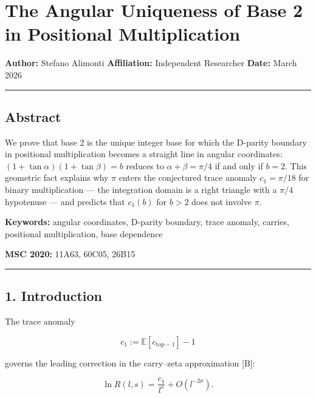 \documentclass[
  11pt,
]{article}
\author{Stefano Alimonti --- stefalimonti@gmail.com}
\date{March 2026}
\begin{document}
{
\hypersetup{linkcolor=black}
\setcounter{tocdepth}{2}
\tableofcontents
}
\section{The Angular Uniqueness of Base 2 in Positional
Multiplication}\label{the-angular-uniqueness-of-base-2-in-positional-multiplication}

\textbf{Author:} Stefano Alimonti \textbf{Affiliation:} Independent Researcher
\textbf{Date:} March 2026

\begin{center}\rule{0.5\linewidth}{0.5pt}\end{center}

\newpage

\subsection{Abstract}\label{abstract}

We prove that base 2 is the unique integer base for which the D-parity boundary
in positional multiplication becomes a straight line in angular coordinates:
\((1+\tan\alpha)(1+\tan\beta) = b\) reduces to \(\alpha + \beta = \pi/4\) if and
only if \(b = 2\). This geometric fact explains why \(\pi\) enters the
conjectured trace anomaly \(c_1 = \pi/18\) for binary multiplication --- the
integration domain is a right triangle with a \(\pi/4\) hypotenuse --- and
predicts that \(c_1(b)\) for \(b > 2\) does not involve \(\pi\).

\textbf{Keywords:} angular coordinates, D-parity boundary, trace anomaly,
carries, positional multiplication, base dependence

\textbf{MSC 2020:} 11A63, 60C05, 26B15

\begin{center}\rule{0.5\linewidth}{0.5pt}\end{center}

\newpage

\subsection{1. Introduction}\label{introduction}

The trace anomaly

\[c_1 := \mathbb{E}[c_{\mathrm{top}-1}] - 1\]

governs the leading correction in the carry--zeta approximation {[}B{]}:

\[\ln R(l,s) = \frac{c_1}{l^s} + O(l^{-2\sigma}).\]
\end{document}
